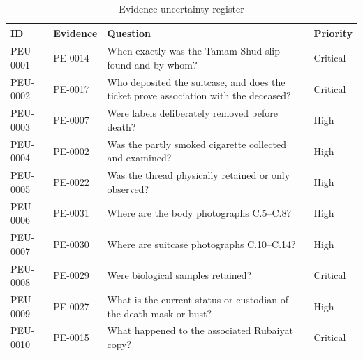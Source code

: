 \begin{table}[htbp]
\centering
\caption{Evidence uncertainty register}
\label{tab:evidence-uncertainty-register-ch6}
\begin{tabularx}{\textwidth}{>{\raggedright\arraybackslash}p{}>{\raggedright\arraybackslash}p{}>{\raggedright\arraybackslash}X>{\raggedright\arraybackslash}p{}}
\toprule
ID & Evidence & Question & Priority \\
\midrule
PEU-0001 & PE-0014 & When exactly was the Tamam Shud slip found and by whom? & Critical \\
PEU-0002 & PE-0017 & Who deposited the suitcase, and does the ticket prove association with the deceased? & Critical \\
PEU-0003 & PE-0007 & Were labels deliberately removed before death? & High \\
PEU-0004 & PE-0002 & Was the partly smoked cigarette collected and examined? & High \\
PEU-0005 & PE-0022 & Was the thread physically retained or only observed? & High \\
PEU-0006 & PE-0031 & Where are the body photographs C.5--C.8? & High \\
PEU-0007 & PE-0030 & Where are suitcase photographs C.10--C.14? & High \\
PEU-0008 & PE-0029 & Were biological samples retained? & Critical \\
PEU-0009 & PE-0027 & What is the current status or custodian of the death mask or bust? & High \\
PEU-0010 & PE-0015 & What happened to the associated Rubaiyat copy? & Critical \\
\bottomrule
\end{tabularx}
\end{table}
